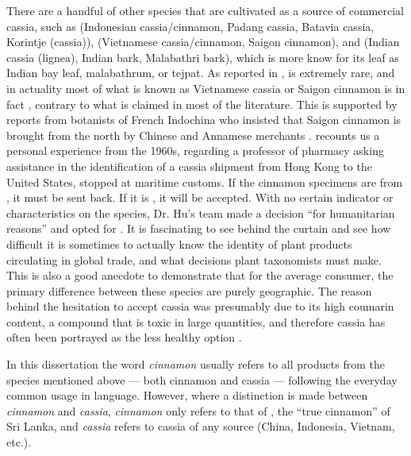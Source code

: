 There are a handful of other species that are cultivated as a source of commercial cassia, such as  (Indonesian cassia/cinnamon, Padang cassia, Batavia cassia, Korintje (cassia)),  (Vietnamese cassia/cinnamon, Saigon cinnamon), and  (Indian cassia (lignea), Indian bark, Malabathri bark), which is more know for its leaf as Indian bay leaf, malabathrum, or tejpat. As reported in \textcite[10]{ravindran_cinnamon_2004},  is extremely rare, and in actuality most of what is known as Vietnamese cassia or Saigon cinnamon is in fact , contrary to what is claimed in most of the literature. This is supported by reports from botanists of French Indochina who insisted that Saigon cinnamon is brought from the north by Chinese and Annamese merchants \parencite[400]{hu_food_2005}. \textcite{hu_food_2005} recounts us a personal experience from the 1960s, regarding a professor of pharmacy asking assistance in the identification of a cassia shipment from Hong Kong to the United States, stopped at maritime customs. If the cinnamon specimens are from , it must be sent back. If it is , it will be accepted. With no certain indicator or characteristics on the species, Dr. Hu's team made a decision ``for humanitarian reasons'' and opted for . It is fascinating to see behind the curtain and see how difficult it is sometimes to actually know the identity of plant products circulating in global trade, and what decisions plant taxonomists must make. This is also a good anecdote to demonstrate that for the average consumer, the primary difference between these  species are purely geographic. The reason behind the hesitation to accept cassia was presumably due to its high coumarin content, a compound that is toxic in large quantities, and therefore cassia has often been portrayed as the less healthy option \autocite{dinesh_controversies_2015}.

\begin{note}
In this dissertation the word \textit{cinnamon} usually refers to all products from the species mentioned above --- both cinnamon and cassia --- following the everyday common usage in language. However, where a distinction is made between \textit{cinnamon} and \textit{cassia}, \textit{cinnamon} only refers to that of , the ``true cinnamon'' of Sri Lanka, and \textit{cassia} refers to cassia of any source (China, Indonesia, Vietnam, etc.).
\end{note}

